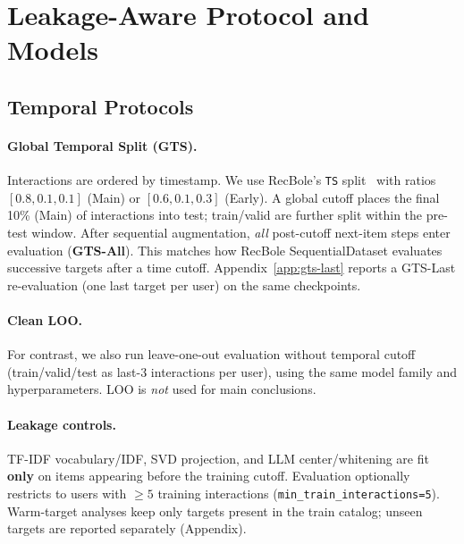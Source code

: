 \documentclass[sigconf,natbib=true,anonymous]{acmart}
\newcommand{\tfidf}{\textsc{TF-IDF}\xspace}
\begin{document}
\section{Leakage-Aware Protocol and Models}

\subsection{Temporal Protocols}
\label{sec:protocol}

\paragraph{Global Temporal Split (GTS).}
Interactions are ordered by timestamp.
We use RecBole's \texttt{TS} split~\cite{zhao2021recbole} with ratios $[0.8,0.1,0.1]$ (Main) or $[0.6,0.1,0.3]$ (Early).
A global cutoff places the final 10\% (Main) of interactions into test; train/valid are further split within the pre-test window.
After sequential augmentation, \emph{all} post-cutoff next-item steps enter evaluation (\textbf{GTS-All}).
This matches how RecBole SequentialDataset evaluates successive targets after a time cutoff.
Appendix~\ref{app:gts-last} reports a GTS-Last re-evaluation (one last target per user) on the same checkpoints.

\paragraph{Clean LOO.}
For contrast, we also run leave-one-out evaluation without temporal cutoff (train/valid/test as last-3 interactions per user), using the same model family and hyperparameters.
LOO is \emph{not} used for main conclusions.

\paragraph{Leakage controls.}
\tfidf vocabulary/IDF, SVD projection, and LLM center/whitening are fit \textbf{only} on items appearing before the training cutoff.
Evaluation optionally restricts to users with $\ge 5$ training interactions (\texttt{min\_train\_interactions=5}).
Warm-target analyses keep only targets present in the train catalog; unseen targets are reported separately (Appendix).
\end{document}

